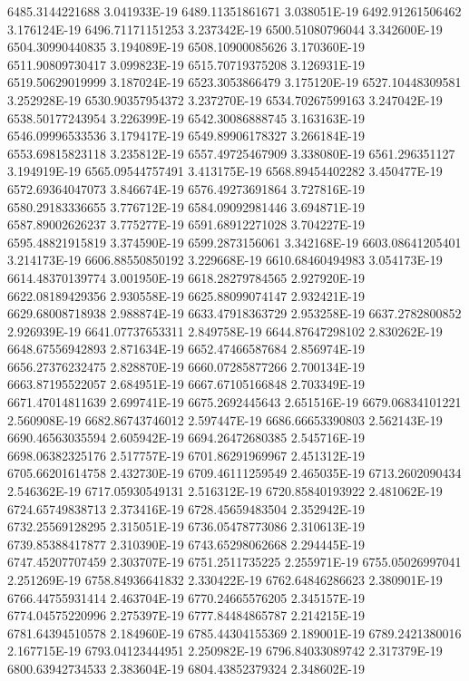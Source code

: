 6485.3144221688  3.041933E-19
6489.11351861671  3.038051E-19
6492.91261506462  3.176124E-19
6496.71171151253  3.237342E-19
6500.51080796044  3.342600E-19
6504.30990440835  3.194089E-19
6508.10900085626  3.170360E-19
6511.90809730417  3.099823E-19
6515.70719375208  3.126931E-19
6519.50629019999  3.187024E-19
6523.3053866479  3.175120E-19
6527.10448309581  3.252928E-19
6530.90357954372  3.237270E-19
6534.70267599163  3.247042E-19
6538.50177243954  3.226399E-19
6542.30086888745  3.163163E-19
6546.09996533536  3.179417E-19
6549.89906178327  3.266184E-19
6553.69815823118  3.235812E-19
6557.49725467909  3.338080E-19
6561.296351127  3.194919E-19
6565.09544757491  3.413175E-19
6568.89454402282  3.450477E-19
6572.69364047073  3.846674E-19
6576.49273691864  3.727816E-19
6580.29183336655  3.776712E-19
6584.09092981446  3.694871E-19
6587.89002626237  3.775277E-19
6591.68912271028  3.704227E-19
6595.48821915819  3.374590E-19
6599.2873156061  3.342168E-19
6603.08641205401  3.214173E-19
6606.88550850192  3.229668E-19
6610.68460494983  3.054173E-19
6614.48370139774  3.001950E-19
6618.28279784565  2.927920E-19
6622.08189429356  2.930558E-19
6625.88099074147  2.932421E-19
6629.68008718938  2.988874E-19
6633.47918363729  2.953258E-19
6637.2782800852  2.926939E-19
6641.07737653311  2.849758E-19
6644.87647298102  2.830262E-19
6648.67556942893  2.871634E-19
6652.47466587684  2.856974E-19
6656.27376232475  2.828870E-19
6660.07285877266  2.700134E-19
6663.87195522057  2.684951E-19
6667.67105166848  2.703349E-19
6671.47014811639  2.699741E-19
6675.2692445643  2.651516E-19
6679.06834101221  2.560908E-19
6682.86743746012  2.597447E-19
6686.66653390803  2.562143E-19
6690.46563035594  2.605942E-19
6694.26472680385  2.545716E-19
6698.06382325176  2.517757E-19
6701.86291969967  2.451312E-19
6705.66201614758  2.432730E-19
6709.46111259549  2.465035E-19
6713.2602090434  2.546362E-19
6717.05930549131  2.516312E-19
6720.85840193922  2.481062E-19
6724.65749838713  2.373416E-19
6728.45659483504  2.352942E-19
6732.25569128295  2.315051E-19
6736.05478773086  2.310613E-19
6739.85388417877  2.310390E-19
6743.65298062668  2.294445E-19
6747.45207707459  2.303707E-19
6751.2511735225  2.255971E-19
6755.05026997041  2.251269E-19
6758.84936641832  2.330422E-19
6762.64846286623  2.380901E-19
6766.44755931414  2.463704E-19
6770.24665576205  2.345157E-19
6774.04575220996  2.275397E-19
6777.84484865787  2.214215E-19
6781.64394510578  2.184960E-19
6785.44304155369  2.189001E-19
6789.2421380016  2.167715E-19
6793.04123444951  2.250982E-19
6796.84033089742  2.317379E-19
6800.63942734533  2.383604E-19
6804.43852379324  2.348602E-19
